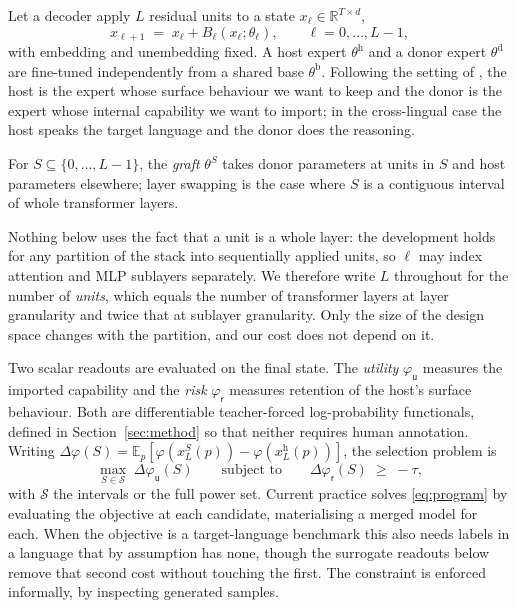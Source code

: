 \documentclass[10pt]{article}
\theoremstyle{plain}
\theoremstyle{definition}
\theoremstyle{remark}
\newcommand{\host}{\mathrm{h}}
\newcommand{\donor}{\mathrm{d}}
\newcommand{\base}{\mathrm{b}}
\newcommand{\util}{\mathsf{u}}
\newcommand{\risk}{\mathsf{r}}
\newcommand{\Rb}{\mathbb{R}}
\newcommand{\Ex}{\mathbb{E}}
\begin{document}
Let a decoder apply $L$ residual units to a state
$x_\ell \in \Rb^{T\times d}$,
\begin{equation}
x_{\ell+1} \;=\; x_\ell + B_\ell(x_\ell;\theta_\ell), \qquad \ell = 0,\dots,L-1,
\end{equation}
with embedding and unembedding fixed. A host expert $\theta^{\host}$ and a
donor expert $\theta^{\donor}$ are fine-tuned independently from a shared base
$\theta^{\base}$. Following the setting of \citet{bandarkar2025layerswap}, the
host is the expert whose surface behaviour we want to keep and the donor is the
expert whose internal capability we want to import; in the cross-lingual case
the host speaks the target language and the donor does the reasoning.

For $S\subseteq\{0,\dots,L-1\}$, the \emph{graft} $\theta^{S}$ takes donor
parameters at units in $S$ and host parameters elsewhere; layer swapping is the
case where $S$ is a contiguous interval of whole transformer layers.

Nothing below uses the fact that a unit is a whole layer: the development holds
for any partition of the stack into sequentially applied units, so $\ell$ may
index attention and MLP sublayers separately. We therefore write $L$ throughout
for the number of \emph{units}, which equals the number of transformer layers at
layer granularity and twice that at sublayer granularity. Only the size of the
design space changes with the partition, and our cost does not depend on it.

Two scalar readouts are evaluated on the final state. The \emph{utility}
$\varphi_\util$ measures the imported capability and the \emph{risk}
$\varphi_\risk$ measures retention of the host's surface behaviour. Both are
differentiable teacher-forced log-probability functionals, defined in
Section~\ref{sec:method} so that neither requires human annotation. Writing
$\Delta\varphi(S) = \Ex_p[\varphi(x_L^{S}(p)) - \varphi(x_L^{\host}(p))]$, the
selection problem is
\begin{equation}
\label{eq:program}
\max_{S\in\mathcal{S}} \;\Delta\varphi_\util(S)
\qquad \text{subject to} \qquad
\Delta\varphi_\risk(S) \;\ge\; -\tau ,
\end{equation}
with $\mathcal{S}$ the intervals or the full power set. Current practice solves
\eqref{eq:program} by evaluating the objective at each candidate, materialising a
merged model for each. When the objective is a target-language benchmark this
also needs labels in a language that by assumption has none, though the surrogate
readouts below remove that second cost without touching the first. The constraint
is enforced informally, by inspecting generated samples.
\end{document}
